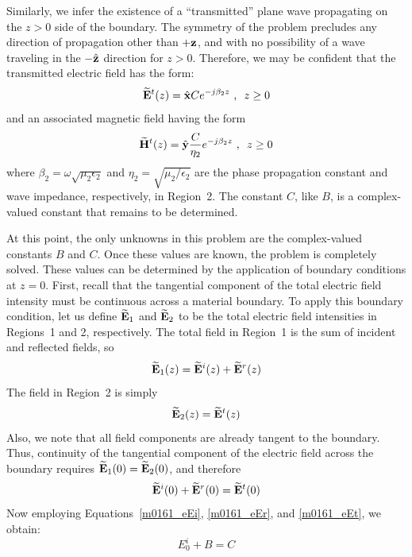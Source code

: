 Similarly, we infer the existence of a ``transmitted'' plane wave propagating on the $z>0$ side of the boundary.  
The symmetry of the problem precludes any direction of propagation other than $+{\bf z}$, and with no possibility of a wave traveling in the $-\hat{\bf z}$ direction for $z>0$. Therefore, we may be confident that the transmitted electric field has the form:
%
\begin{equation}
\widetilde{\bf E}^t(z) = \hat{\bf x} C e^{-j\beta_2 z}~\mbox{,}~~z \ge 0
\label{m0161_eEt}
\end{equation}
%
and an associated magnetic field having the form
%
\begin{equation}
\widetilde{\bf H}^t(z) = \hat{\bf y} \frac{C}{\eta_2} e^{-j\beta_2 z}~\mbox{,}~~z \ge 0
\label{m0161_eHt}
\end{equation}
%
where $\beta_2=\omega\sqrt{\mu_2 \epsilon_2}$ and $\eta_2=\sqrt{\mu_2 / \epsilon_2}$ are the phase propagation constant and wave impedance, respectively, in Region~2.
The constant $C$, like $B$, is a complex-valued constant that remains to be determined.

At this point, the only unknowns in this problem are the complex-valued constants $B$ and $C$.  
Once these values are known, the problem is completely solved.  
These values can be determined by the application of boundary conditions at $z=0$.  
First, recall that the tangential component of the total electric field intensity must be continuous across a material boundary.
To apply this boundary condition, let us define $\widetilde{\bf E}_1$ and $\widetilde{\bf E}_2$ to be the total electric field intensities in Regions~1 and 2, respectively.
The total field in Region~1 is the sum of incident and reflected fields, so
%
\begin{equation}
\widetilde{\bf E}_1(z) = \widetilde{\bf E}^i(z) + \widetilde{\bf E}^r(z)
\end{equation}
%
The field in Region~2 is simply
%
\begin{equation}
\widetilde{\bf E}_2(z) = \widetilde{\bf E}^t(z)
\end{equation}
%
Also, we note that all field components are already tangent to the boundary.
Thus, continuity of the tangential component of the electric field across the boundary requires $\widetilde{\bf E}_1(0)=\widetilde{\bf E}_2(0)$, and therefore
%
\begin{equation}
\widetilde{\bf E}^i(0) + \widetilde{\bf E}^r(0)  = \widetilde{\bf E}^t(0) %
\end{equation}
%
Now employing Equations~\ref{m0161_eEi}, \ref{m0161_eEr}, and \ref{m0161_eEt}, we obtain:
%
\begin{equation}
E_0^i + B = C
\label{m0161_eBCE}
\end{equation}

